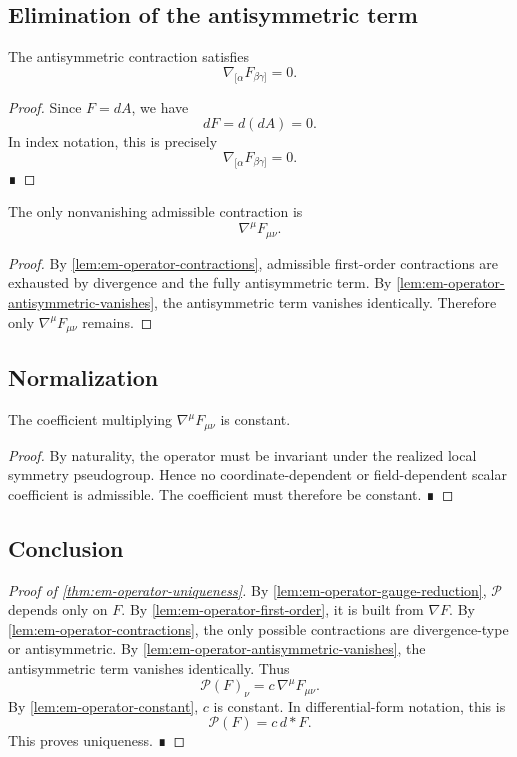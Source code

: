\subsection{Elimination of the antisymmetric term}
\begin{lemma}
	\label{lem:em-operator-antisymmetric-vanishes}
	The antisymmetric contraction satisfies
	\[
		\nabla_{[\alpha}F_{\beta\gamma]} = 0.
	\]
\end{lemma}
\begin{proof}
	Since $F=dA$, we have
	\[
		dF = d(dA) = 0.
	\]
	In index notation, this is precisely
	\[
		\nabla_{[\alpha}F_{\beta\gamma]} = 0.
	\]
	∎
\end{proof}
\begin{corollary}
	The only nonvanishing admissible contraction is
	\[
		\nabla^\mu F_{\mu\nu}.
	\]
\end{corollary}
\begin{proof}
	By \cref{lem:em-operator-contractions}, admissible first-order
	contractions are exhausted by divergence and the fully antisymmetric
	term.
	By \cref{lem:em-operator-antisymmetric-vanishes}, the antisymmetric term
	vanishes identically.
	Therefore only \(\nabla^\mu F_{\mu\nu}\) remains.
\end{proof}
\subsection{Normalization}
\begin{lemma}
	\label{lem:em-operator-constant}
	The coefficient multiplying $\nabla^\mu F_{\mu\nu}$ is constant.
\end{lemma}
\begin{proof}
	By naturality, the operator must be invariant under the realized local
	symmetry pseudogroup.
	Hence no coordinate-dependent or field-dependent scalar coefficient is
	admissible.
	The coefficient must therefore be constant. ∎
\end{proof}
\subsection{Conclusion}
\begin{proof}[Proof of \cref{thm:em-operator-uniqueness}]
	By \cref{lem:em-operator-gauge-reduction}, $\mathcal P$ depends only on $F$.
	By \cref{lem:em-operator-first-order}, it is built from
	$\nabla F$.
	By \cref{lem:em-operator-contractions}, the only possible contractions
	are divergence-type or antisymmetric.
	By \cref{lem:em-operator-antisymmetric-vanishes}, the antisymmetric term
	vanishes identically.
	Thus
	\[
		\mathcal P(F)_\nu = c\, \nabla^\mu F_{\mu\nu}.
	\]
	By \cref{lem:em-operator-constant}, $c$ is constant.
	In differential-form notation, this is
	\[
		\mathcal P(F)=c\, d{*}F.
	\]
	This proves uniqueness. ∎
\end{proof}
